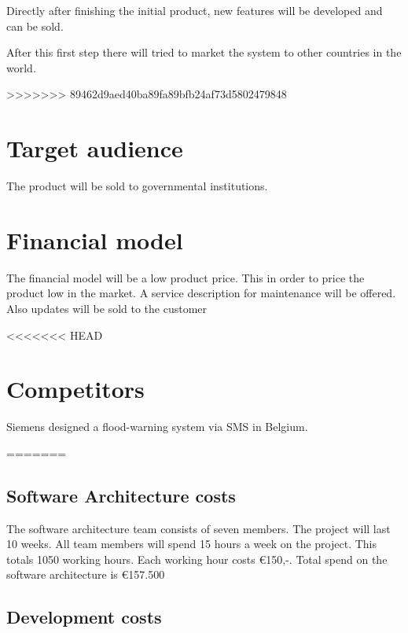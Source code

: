 Directly after finishing the initial product, new features will be developed and can be sold.

After this first step there will tried to market the system to other countries in the world. 

>>>>>>> 89462d9aed40ba89fa89bfb24af73d5802479848

\section{Target audience}
The product will be sold to governmental institutions. 

\section{Financial model}
The financial model will be a low product price. This in order to price the product low in the market. A service description for maintenance will be offered. Also updates will be sold to the customer

<<<<<<< HEAD
\section{Competitors}
Siemens designed a flood-warning system via SMS in Belgium.

=======
\subsection{Software Architecture costs}
The software architecture team consists of seven members. The project will last 10 weeks. All team members will spend 15 hours a week on the project. This totals 1050 working hours. Each working hour costs €150,-. Total spend on the software architecture is €157.500
\subsection{Development costs}

